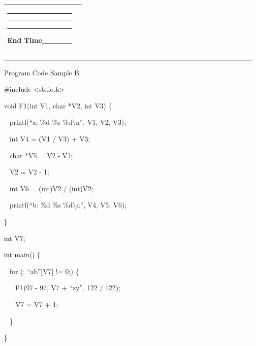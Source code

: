 \documentclass[]{article}
\begin{document}
\begin{longtable}[]{@{}ll@{}}
\begin{minipage}[t]{0.47\columnwidth}
{}

\begin{center}\rule{0.5\linewidth}{\linethickness}\end{center}

{}

\begin{center}\rule{0.5\linewidth}{\linethickness}\end{center}

{}

\begin{center}\rule{0.5\linewidth}{\linethickness}\end{center}

{}

{}

{End Time\_\_\_\_\_}
\strut\end{minipage}\tabularnewline
\bottomrule
\end{longtable}

\begin{center}\rule{0.5\linewidth}{\linethickness}\end{center}

{Program Code Sample B}

{}

{\#include \textless{}stdio.h\textgreater{}}

{void F1(int V1, char *V2, int V3) \{}

{~ printf(``a: \%d \%s \%d\textbackslash{}n'', V1, V2, V3);}

{~ int V4 = (V1 / V3) + V3;}

{~ char *V5 = V2 - V1;}

{~ V2 = V2 - 1;}

{~ int V6 = (int)V2 / (int)V2;}

{~ printf(``b: \%d \%s \%d\textbackslash{}n'', V4, V5, V6);}

{\}}

{int V7;}

{int main() \{}

{~ for (; ``ab''{[}V7{]} != 0;) \{}

{~ ~ F1(97 - 97, V7 + ``zy'', 122 / 122);}

{~ ~ V7 = V7 + 1;}

{~ \}}

{\}}

{}

{}

{}

{}

\href{}{}\href{}{}
\end{document}
